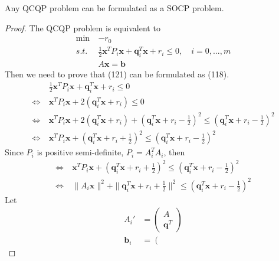 \documentclass[runningheads]{llncs}
\begin{document}
\begin{lemma}
    Any QCQP problem can be formulated as a SOCP problem.
\end{lemma}
\begin{proof}
    The QCQP problem is equivalent to
    \begin{align}
        \min \ & - r_0 \\
        s.t. \ &\frac{1}{2} \mathbf{x}^T P_i \mathbf{x}
        + \mathbf{q}_i^T \mathbf{x} + r_i \leq 0, \quad i = 0,...,m \\
        & A \mathbf{x} = \mathbf{b}
    \end{align}
    Then we need to prove that (121) can be formulated as (118).
    \begin{align}
        &\frac{1}{2} \mathbf{x}^T P_i \mathbf{x}
        + \mathbf{q}_i^T \mathbf{x} + r_i \leq 0 \\
        \Leftrightarrow \ & \mathbf{x}^T P_i \mathbf{x}
        + 2(\mathbf{q}_i^T \mathbf{x} + r_i) \leq 0 \\
        \Leftrightarrow \ & \mathbf{x}^T P_i \mathbf{x}
        + 2(\mathbf{q}_i^T \mathbf{x} + r_i)
        + (\mathbf{q}_i^T \mathbf{x} + r_i - \frac{1}{2})^2
         \leq (\mathbf{q}_i^T \mathbf{x} + r_i - \frac{1}{2})^2 \\
         \Leftrightarrow \ & \mathbf{x}^T P_i \mathbf{x}
         + (\mathbf{q}_i^T \mathbf{x} + r_i + \frac{1}{2})^2
          \leq (\mathbf{q}_i^T \mathbf{x} + r_i - \frac{1}{2})^2
    \end{align}
    Since $P_i$ is positive semi-definite, $P_i = A_i^TA_i$, then
    \begin{align}
        \Leftrightarrow \ & \mathbf{x}^T P_i \mathbf{x}
        + (\mathbf{q}_i^T \mathbf{x} + r_i + \frac{1}{2})^2
         \leq (\mathbf{q}_i^T \mathbf{x} + r_i - \frac{1}{2})^2 \\
         \Leftrightarrow \ & \parallel A_i \mathbf{x} \parallel^2
         + \parallel \mathbf{q}_i^T \mathbf{x} + r_i + \frac{1}{2}\parallel^2
          \leq (\mathbf{q}_i^T \mathbf{x} + r_i - \frac{1}{2})^2 
    \end{align}
    Let
    \begin{align}
        A_i' &= \left(
            \begin{array}{ll}
                A \\
                \mathbf{q}^T
            \end{array}\right) \\
            \mathbf{b}_i &= \left(
                \begin{array}{ll}

\end{array}
\end{align}
\end{proof}
\end{document}

